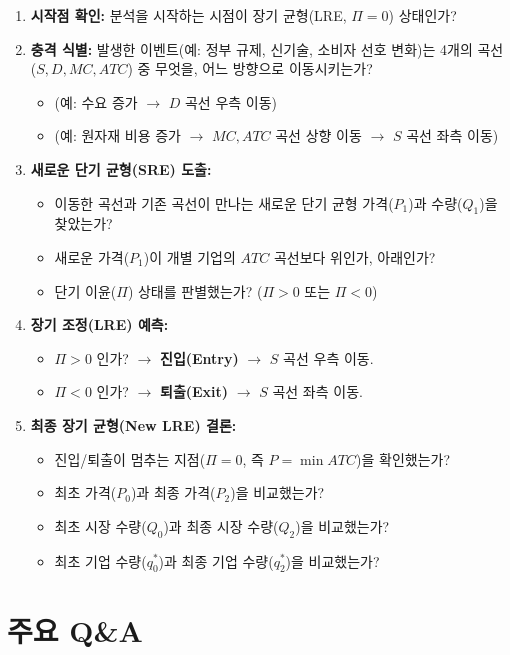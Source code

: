 \documentclass[11pt,a4paper]{book}
\theoremstyle{definition}
\begin{document}
\begin{enumerate}
    \item [ ] \textbf{시작점 확인:} 분석을 시작하는 시점이 장기 균형(LRE, $\Pi=0$) 상태인가?
    \item [ ] \textbf{충격 식별:} 발생한 이벤트(예: 정부 규제, 신기술, 소비자 선호 변화)는 4개의 곡선 ($S, D, MC, ATC$) 중 무엇을, 어느 방향으로 이동시키는가?
    \begin{itemize}
        \item (예: 수요 증가 $\to$ $D$ 곡선 우측 이동)
        \item (예: 원자재 비용 증가 $\to$ $MC, ATC$ 곡선 상향 이동 $\to$ $S$ 곡선 좌측 이동)
    \end{itemize}
    \item [ ] \textbf{새로운 단기 균형(SRE) 도출:}
    \begin{itemize}
        \item [ ] 이동한 곡선과 기존 곡선이 만나는 새로운 단기 균형 가격($P_1$)과 수량($Q_1$)을 찾았는가?
        \item [ ] 새로운 가격($P_1$)이 개별 기업의 $ATC$ 곡선보다 위인가, 아래인가?
        \item [ ] 단기 이윤($\Pi$) 상태를 판별했는가? ($\Pi > 0$ 또는 $\Pi < 0$)
    \end{itemize}
    \item [ ] \textbf{장기 조정(LRE) 예측:}
    \begin{itemize}
        \item [ ] $\Pi > 0$ 인가? $\to$ \textbf{진입(Entry)} $\to$ $S$ 곡선 우측 이동.
        \item [ ] $\Pi < 0$ 인가? $\to$ \textbf{퇴출(Exit)} $\to$ $S$ 곡선 좌측 이동.
    \end{itemize}
    \item [ ] \textbf{최종 장기 균형(New LRE) 결론:}
    \begin{itemize}
        \item [ ] 진입/퇴출이 멈추는 지점($\Pi=0$, 즉 $P = \min ATC$)을 확인했는가?
        \item [ ] 최초 가격($P_0$)과 최종 가격($P_2$)을 비교했는가?
        \item [ ] 최초 시장 수량($Q_0$)과 최종 시장 수량($Q_2$)을 비교했는가?
        \item [ ] 최초 기업 수량($q_0^*$)과 최종 기업 수량($q_2^*$)을 비교했는가?
    \end{itemize}
\end{enumerate}

\section{주요 Q\&A}
\end{document}
